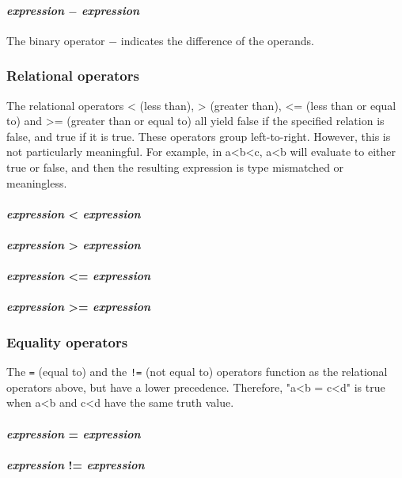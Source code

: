 \paragraph{\textit{expression} $-$ \textit{expression}}
The binary operator $-$ indicates the difference of the operands.
\\
\subsubsection{Relational operators}
The  relational operators < (less than), > (greater than), <= (less than or equal to) and >= (greater than or equal to) all yield false if the specified relation is false, and true if it is true. These operators group left-to-right. However, this is not particularly meaningful. For example, in a<b<c, a<b will evaluate to either true or false, and then the resulting expression is type mismatched or meaningless.

\paragraph{\textit{expression} < \textit{expression}}
\paragraph{\textit{expression} > \textit{expression}}
\paragraph{\textit{expression} <= \textit{expression}}
\paragraph{\textit{expression} >= \textit{expression}}


\subsubsection{Equality operators}
The \texttt{=} (equal to) and the \texttt{!=} (not equal to) operators function as the relational operators above, but have a lower precedence. Therefore, "a<b = c<d" is true when a<b and c<d have the same truth value.
\\
\paragraph{\textit{expression} = \textit{expression}}
\paragraph{\textit{expression} != \textit{expression}}

